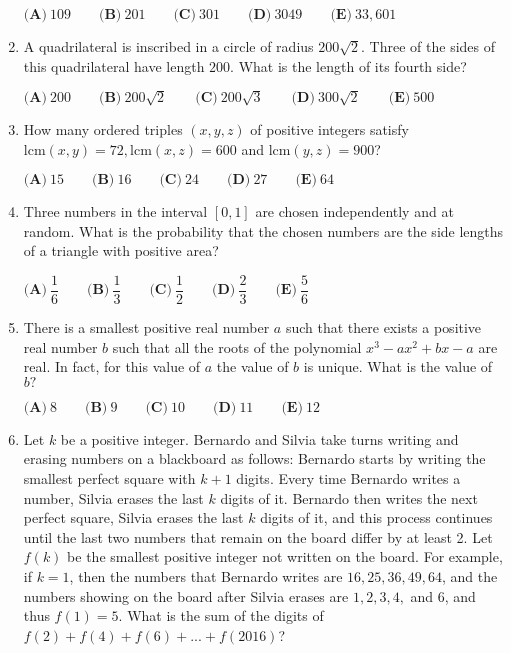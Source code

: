 \documentclass{article}
\begin{document}
\begin{enumerate}[label=\arabic*., itemsep=0.5em]
\(\textbf{(A)}\ 109\qquad\textbf{(B)}\ 201\qquad\textbf{(C)}\ 301\qquad\textbf{(D)}\ 3049\qquad\textbf{(E)}\ 33,601\)\par \vspace{0.5em}\item A quadrilateral is inscribed in a circle of radius \(200\sqrt{2}.\) Three of the sides of this quadrilateral have length \(200.\) What is the length of its fourth side? 

\(\textbf{(A)}\ 200\qquad\textbf{(B)}\ 200\sqrt{2} \qquad\textbf{(C)}\ 200\sqrt{3} \qquad\textbf{(D)}\ 300\sqrt{2} \qquad\textbf{(E)}\ 500\)\par \vspace{0.5em}\item How many ordered triples \((x,y,z)\) of positive integers satisfy \(\text{lcm}(x,y) = 72, \text{lcm}(x,z) = 600\) and \(\text{lcm}(y,z)=900\)?

\(\textbf{(A)}\ 15\qquad\textbf{(B)}\ 16\qquad\textbf{(C)}\ 24\qquad\textbf{(D)}\ 27\qquad\textbf{(E)}\ 64\)\par \vspace{0.5em}\item Three numbers in the interval \(\left[0,1\right]\) are chosen independently and at random. What is the probability that the chosen numbers are the side lengths of a triangle with positive area?

\(\textbf{(A)}\ \dfrac{1}{6}\qquad\textbf{(B)}\ \dfrac{1}{3}\qquad\textbf{(C)}\ \dfrac{1}{2}\qquad\textbf{(D)}\ \dfrac{2}{3}\qquad\textbf{(E)}\ \dfrac{5}{6}\)\par \vspace{0.5em}\item There is a smallest positive real number \(a\) such that there exists a positive real number \(b\) such that all the roots of the polynomial \(x^3-ax^2+bx-a\) are real. In fact, for this value of \(a\) the value of \(b\) is unique. What is the value of \(b?\)

\(\textbf{(A)}\ 8\qquad\textbf{(B)}\ 9\qquad\textbf{(C)}\ 10\qquad\textbf{(D)}\ 11\qquad\textbf{(E)}\ 12\)\par \vspace{0.5em}\item Let \(k\) be a positive integer. Bernardo and Silvia take turns writing and erasing numbers on a blackboard as follows: Bernardo starts by writing the smallest perfect square with \(k+1\) digits. Every time Bernardo writes a number, Silvia erases the last \(k\) digits of it. Bernardo then writes the next perfect square, Silvia erases the last \(k\) digits of it, and this process continues until the last two numbers that remain on the board differ by at least 2. Let \(f(k)\) be the smallest positive integer not written on the board. For example, if \(k = 1\), then the numbers that Bernardo writes are \(16, 25, 36, 49, 64\), and the numbers showing on the board after Silvia erases are \(1, 2, 3, 4,\) and \(6\), and thus \(f(1) = 5\). What is the sum of the digits of \(f(2) + f(4)+ f(6) + ... + f(2016)\)?


\end{enumerate}
\end{document}
